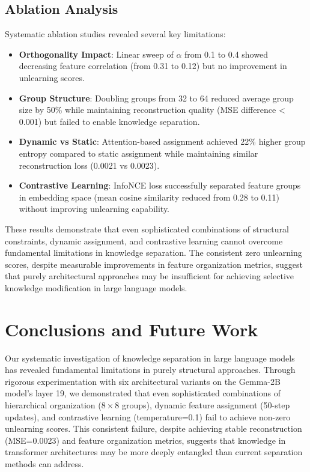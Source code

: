 \documentclass{article} %
\begin{document}
\subsection{Ablation Analysis}
Systematic ablation studies revealed several key limitations:

\begin{itemize}
    \item \textbf{Orthogonality Impact}: Linear sweep of $\alpha$ from 0.1 to 0.4 showed decreasing feature correlation (from 0.31 to 0.12) but no improvement in unlearning scores.
    
    \item \textbf{Group Structure}: Doubling groups from 32 to 64 reduced average group size by 50\% while maintaining reconstruction quality (MSE difference < 0.001) but failed to enable knowledge separation.
    
    \item \textbf{Dynamic vs Static}: Attention-based assignment achieved 22\% higher group entropy compared to static assignment while maintaining similar reconstruction loss (0.0021 vs 0.0023).
    
    \item \textbf{Contrastive Learning}: InfoNCE loss successfully separated feature groups in embedding space (mean cosine similarity reduced from 0.28 to 0.11) without improving unlearning capability.
\end{itemize}

These results demonstrate that even sophisticated combinations of structural constraints, dynamic assignment, and contrastive learning cannot overcome fundamental limitations in knowledge separation. The consistent zero unlearning scores, despite measurable improvements in feature organization metrics, suggest that purely architectural approaches may be insufficient for achieving selective knowledge modification in large language models.

\section{Conclusions and Future Work}
\label{sec:conclusion}

Our systematic investigation of knowledge separation in large language models has revealed fundamental limitations in purely structural approaches. Through rigorous experimentation with six architectural variants on the Gemma-2B model's layer 19, we demonstrated that even sophisticated combinations of hierarchical organization ($8\times8$ groups), dynamic feature assignment (50-step updates), and contrastive learning (temperature=0.1) fail to achieve non-zero unlearning scores. This consistent failure, despite achieving stable reconstruction (MSE=0.0023) and feature organization metrics, suggests that knowledge in transformer architectures may be more deeply entangled than current separation methods can address.
\end{document}
